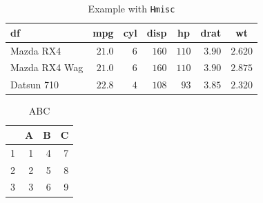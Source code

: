 \documentclass{article}\usepackage[]{graphicx}\usepackage[]{xcolor}
\begin{document}
\begin{table}[!tbp]
\caption{Example with  \texttt{Hmisc}\label{df}} 
\begin{center}
\begin{tabular}{lrrrrrr}
\hline\hline
\multicolumn{1}{l}{df}&\multicolumn{1}{c}{mpg}&\multicolumn{1}{c}{cyl}&\multicolumn{1}{c}{disp}&\multicolumn{1}{c}{hp}&\multicolumn{1}{c}{drat}&\multicolumn{1}{c}{wt}\tabularnewline
\hline
Mazda RX4&$21.0$&$6$&$160$&$110$&$3.90$&$2.620$\tabularnewline
Mazda RX4 Wag&$21.0$&$6$&$160$&$110$&$3.90$&$2.875$\tabularnewline
Datsun 710&$22.8$&$4$&$108$&$ 93$&$3.85$&$2.320$\tabularnewline
\hline
\end{tabular}\end{center}
\end{table}
\begin{table}[ht]
\centering
\begin{tabular}{rrrr}
  \hline
 & A & B & C \\ 
  \hline
1 &   1 &   4 &   7 \\ 
  2 &   2 &   5 &   8 \\ 
  3 &   3 &   6 &   9 \\ 
   \hline
\end{tabular}
\caption{ABC} 
\end{table}
\end{document}
